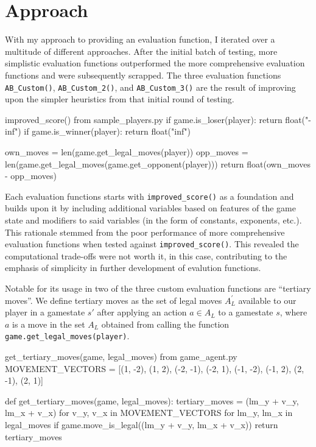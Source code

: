 \documentclass[12pt]{article}
\newcommand{\code}[2][python]{\texttt{#2}}
\begin{document}
\section*{Approach}
With my approach to providing an evaluation function, I iterated over a
multitude of different approaches. After the initial batch of testing, more
simplistic evaluation functions outperformed the more comprehensive evaluation
functions and were subsequently scrapped. The three evaluation
functions \code{AB_Custom()}, \code{AB_Custom_2()}, and \code{AB_Custom_3()} 
are the result of improving upon the simpler heuristics from that initial round
of testing.

\begin{codeblock}{improved\_score() from sample\_players.py}
    if game.is_loser(player):
        return float("-inf")
    if game.is_winner(player):
        return float("inf")

    own_moves = len(game.get_legal_moves(player))
    opp_moves = len(game.get_legal_moves(game.get_opponent(player)))
    return float(own_moves - opp_moves)
\end{codeblock}
    
Each evaluation functions starts with \code{improved_score()} as
a foundation and builds upon it by including additional variables based on
features of the game state and modifiers to said variables (in the form
of constants, exponents, etc.). This rationale stemmed from the poor
performance of more comprehensive evaluation functions when tested against
\code{improved_score()}. This revealed the computational trade-offs were
not worth it, in this case, contributing to the emphasis of simplicity in
further development of evalution functions.

Notable for its usage in two of the three custom evaluation functions are
``tertiary moves''. We define tertiary moves as the set of legal moves $A_L^\prime$
available to our player in a gamestate $s'$ after applying an action $a\in A_L$ 
to a gamestate $s$, where $a$ is a move in the set $A_L$ obtained from calling the
function \code{game.get_legal_moves(player)}.

\begin{codeblock}{get\_tertiary\_moves(game, legal\_moves) from game\_agent.py}
MOVEMENT_VECTORS = [(1, -2), (1, 2), (-2, -1), (-2, 1),
        (-1, -2), (-1, 2), (2, -1), (2, 1)]

def get_tertiary_moves(game, legal_moves):
    tertiary_moves = {(lm_y + v_y, lm_x + v_x)
                      for v_y, v_x in MOVEMENT_VECTORS
                      for lm_y, lm_x in legal_moves
                      if game.move_is_legal((lm_y + v_y, lm_x + v_x))}
    return tertiary_moves
\end{codeblock}
\end{document}
